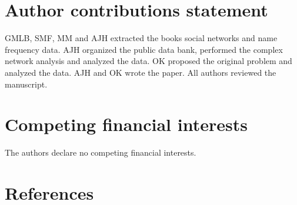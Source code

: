 \documentclass[review]{elsarticle}
\begin{document}
\section*{Author contributions statement}

GMLB, SMF, MM and AJH extracted the books social networks and 
name frequency data. AJH organized the public data bank, 
performed the complex network analysis and analyzed the data.
OK proposed the original problem and analyzed the data. AJH and
OK wrote the paper. All authors reviewed the manuscript.

\section*{Competing financial interests} The authors 
declare no competing financial interests.

\section*{References}

 

\end{document}
